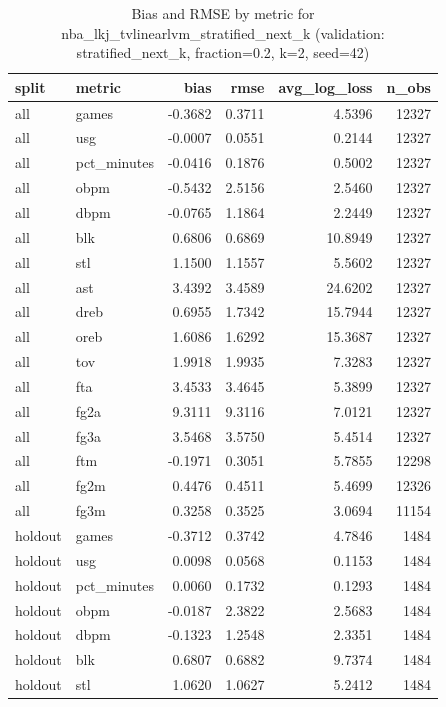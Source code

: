 \begin{table}
\caption{Bias and RMSE by metric for nba_lkj_tvlinearlvm_stratified_next_k (validation: stratified_next_k, fraction=0.2, k=2, seed=42)}
\label{tab:nba_lkj_tvlinearlvm_stratified_next_k_vs_stratified_next_k_f20_k2_s42_bias_rmse}
\begin{tabular}{llrrrr}
\toprule
split & metric & bias & rmse & avg\_log\_loss & n\_obs \\
\midrule
all & games & -0.3682 & 0.3711 & 4.5396 & 12327 \\
all & usg & -0.0007 & 0.0551 & 0.2144 & 12327 \\
all & pct\_minutes & -0.0416 & 0.1876 & 0.5002 & 12327 \\
all & obpm & -0.5432 & 2.5156 & 2.5460 & 12327 \\
all & dbpm & -0.0765 & 1.1864 & 2.2449 & 12327 \\
all & blk & 0.6806 & 0.6869 & 10.8949 & 12327 \\
all & stl & 1.1500 & 1.1557 & 5.5602 & 12327 \\
all & ast & 3.4392 & 3.4589 & 24.6202 & 12327 \\
all & dreb & 0.6955 & 1.7342 & 15.7944 & 12327 \\
all & oreb & 1.6086 & 1.6292 & 15.3687 & 12327 \\
all & tov & 1.9918 & 1.9935 & 7.3283 & 12327 \\
all & fta & 3.4533 & 3.4645 & 5.3899 & 12327 \\
all & fg2a & 9.3111 & 9.3116 & 7.0121 & 12327 \\
all & fg3a & 3.5468 & 3.5750 & 5.4514 & 12327 \\
all & ftm & -0.1971 & 0.3051 & 5.7855 & 12298 \\
all & fg2m & 0.4476 & 0.4511 & 5.4699 & 12326 \\
all & fg3m & 0.3258 & 0.3525 & 3.0694 & 11154 \\
holdout & games & -0.3712 & 0.3742 & 4.7846 & 1484 \\
holdout & usg & 0.0098 & 0.0568 & 0.1153 & 1484 \\
holdout & pct\_minutes & 0.0060 & 0.1732 & 0.1293 & 1484 \\
holdout & obpm & -0.0187 & 2.3822 & 2.5683 & 1484 \\
holdout & dbpm & -0.1323 & 1.2548 & 2.3351 & 1484 \\
holdout & blk & 0.6807 & 0.6882 & 9.7374 & 1484 \\
holdout & stl & 1.0620 & 1.0627 & 5.2412 & 1484 \\

\end{tabular}
\end{table}
